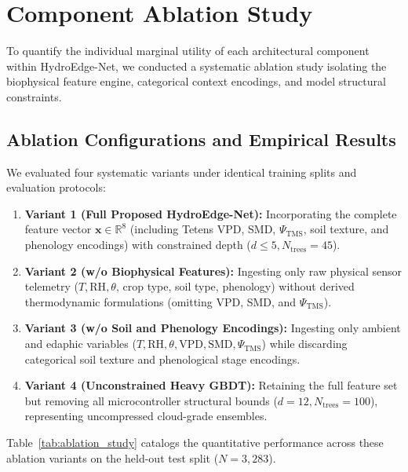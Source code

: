 \section{Component Ablation Study}
\label{sec:ablation}

To quantify the individual marginal utility of each architectural component within HydroEdge-Net, we conducted a systematic ablation study isolating the biophysical feature engine, categorical context encodings, and model structural constraints.

\subsection{Ablation Configurations and Empirical Results}

We evaluated four systematic variants under identical training splits and evaluation protocols:
\begin{enumerate}
    \item \textbf{Variant 1 (Full Proposed HydroEdge-Net):} Incorporating the complete feature vector $\mathbf{x} \in \mathbb{R}^8$ (including Tetens VPD, SMD, $\Psi_{\text{TMS}}$, soil texture, and phenology encodings) with constrained depth ($d \le 5, N_{\text{trees}}=45$).
    \item \textbf{Variant 2 (w/o Biophysical Features):} Ingesting only raw physical sensor telemetry ($T, \text{RH}, \theta$, crop type, soil type, phenology) without derived thermodynamic formulations (omitting VPD, SMD, and $\Psi_{\text{TMS}}$).
    \item \textbf{Variant 3 (w/o Soil and Phenology Encodings):} Ingesting only ambient and edaphic variables ($T, \text{RH}, \theta, \text{VPD}, \text{SMD}, \Psi_{\text{TMS}}$) while discarding categorical soil texture and phenological stage encodings.
    \item \textbf{Variant 4 (Unconstrained Heavy GBDT):} Retaining the full feature set but removing all microcontroller structural bounds ($d = 12, N_{\text{trees}} = 100$), representing uncompressed cloud-grade ensembles.
\end{enumerate}

Table~\ref{tab:ablation_study} catalogs the quantitative performance across these ablation variants on the held-out test split ($N = 3,283$).

